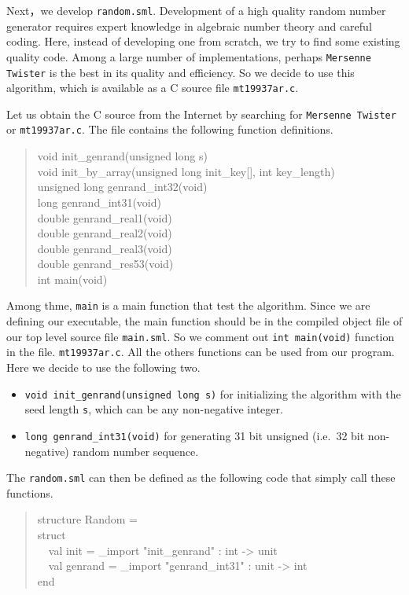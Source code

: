 \documentclass{jbook}
\newcommand{\myem}{\mbox{\ \ }}
\newenvironment{program}{\begin{quote}\begin{tt}}%
                        {\end{tt}\end{quote}}
\begin{document}
	Next，we develop {\tt random.sml}.
	Development of a high quality random number generator requires
expert knowledge in algebraic number theory and careful coding.
	Here, instead of developing one from scratch, we try to find
some existing quality code.
	Among a large number of implementations, perhaps {\tt Mersenne
Twister} is the best in its quality and efficiency.
	So we decide to use this algorithm, which is available as a C
source file {\tt mt19937ar.c}.
	
	Let us obtain the C source from the Internet by searching for
{\tt Mersenne Twister} or {\tt mt19937ar.c}.
	The file contains the following function definitions.
\begin{program}
void init\_genrand(unsigned long s)\\
void init\_by\_array(unsigned long init\_key[], int key\_length)\\
unsigned long genrand\_int32(void)\\
long genrand\_int31(void)\\
double genrand\_real1(void)\\
double genrand\_real2(void)\\
double genrand\_real3(void)\\
double genrand\_res53(void)\\
int main(void)
\end{program}
	Among thme, {\tt main} is a main function that test the
algorithm.
	Since we are defining our executable, the main function should
be in the compiled object file of our top level source file {\tt main.sml}.
	So we comment out {\tt int main(void)} function in the
file. {\tt mt19937ar.c}.
	All the others functions can be used from our program.
	Here we decide to use the following two.
\begin{itemize}
\item {\tt void init\_genrand(unsigned long s)} for initializing the
algorithm with the seed length {\tt s}, which can be any non-negative
integer.
\item {\tt long genrand\_int31(void)} for generating 31 bit unsigned
(i.e.\ 32 bit non-negative) random number sequence.
\end{itemize}
	The {\tt random.sml} can then be defined as the following code
that simply call these functions.
\begin{program}
structure Random =\\
struct\\
\myem  val init = \_import "init\_genrand" : int -> unit\\
\myem  val genrand = \_import "genrand\_int31" : unit -> int\\
end
\end{program}
\end{document}
